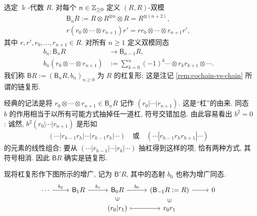 \begin{definition}[杠复形]\label{def:bar-Hochschild}
	选定 $\Bbbk$-代数 $R$. 对每个 $n \in \mathbb{Z}_{\geq 0}$ 定义 $(R,R)$-双模
	\begin{gather*}
		\mathsf{B}_n R := R \otimes R^{\otimes n} \otimes R = R^{\otimes (n+2)}, \\
		r(r_0 \otimes \cdots \otimes r_{n+1})r' = rr_0 \otimes \cdots \otimes r_{n+1} r' ,
	\end{gather*}
	其中 $r, r', r_0, \ldots, r_{n+1} \in R$. 对所有 $n \geq 1$ 定义双模同态
	\begin{equation*}\begin{split}
		b_n: \mathsf{B}_n R & \to \mathsf{B}_{n-1} R, \\
		b_n \left( r_0 \otimes \cdots \otimes r_{n+1} \right) & := \sum_{k=0}^n (-1)^k \cdots \otimes r_k r_{k+1} \otimes \cdots .
	\end{split}\end{equation*}
	 我们称 $\mathsf{B} R := \left( \mathsf{B}_n R, b_n \right)_{n \geq 0}$ 为 $R$ 的杠复形; 这是注记 \ref{rem:cochain-vs-chain} 所谓的链复形.
\end{definition}

经典的记法是将 $r_0 \otimes \cdots \otimes r_{n+1} \in \mathsf{B}_n R$ 记作 $(r_0 | \cdots | r_{n+1})$. 这是``杠''的由来. 同态 $b$ 的作用相当于以所有可能方式抽掉任一道杠, 符号交错加总. 由此容易看出 $b^2 = 0$: 诚然, $b^2 (r_0 | \cdots | r_{n+1})$ 是形如
\begin{gather*}
	(\cdots |r_{h-1} r_h| \cdots |r_{k-1} r_k| \cdots ) \quad \text{或} \quad ( \cdots | r_{h-1} r_h r_{h+1} | \cdots )
\end{gather*}
的元素的线性组合; 要从 $(\cdots |r_{h-1} | \cdots | r_k | \cdots)$ 抽杠得到这样的项, 恰有两种方式, 其符号相消. 因此 $\mathsf{B} R$ 确实是链复形.

现将杠复形作下图所示的增广, 记为 $\mathsf{B}' R$, 其中的态射 $b_0$ 也称为增广同态.
\[\begin{tikzcd}[row sep=small]
	\cdots \arrow[r, "b_2"] & \mathsf{B}_1 R \arrow[r, "b_1"] & \mathsf{B}_0 R \arrow[r, "b_0"] & (\mathsf{B}_{-1} R := R) \arrow[r] & 0 \\
	& & (r_0 | r_1) \arrow[mapsto, r] \arrow[phantom, u, "\in" description, sloped] & r_0 r_1 \arrow[phantom, u, "\in" description, sloped] &
\end{tikzcd}\]

